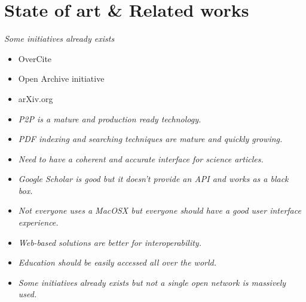 \section{State of art \& Related works}

\textit{Some initiatives already exists}

\begin{itemize}
\item OverCite
\item Open Archive initiative
\item arXiv.org
\end{itemize}
\begin{itemize}

\item \textit{P2P is a mature and production ready technology.}

\item \textit{PDF indexing and searching techniques are mature and quickly growing.}

\item \textit{Need to have a coherent and accurate interface for science articles.}

\end{itemize}

\begin{itemize}

\item \textit{Google Scholar is good but it doesn't provide an API and works as a black box.}

\item \textit{Not everyone uses a MacOSX but everyone should have a good user interface experience.}

\item \textit{Web-based solutions are better for interoperability.}

\item \textit{Education should be easily accessed all over the world.}

\item \textit{Some initiatives already exists but not a single open network is massively used.}

\end{itemize}

